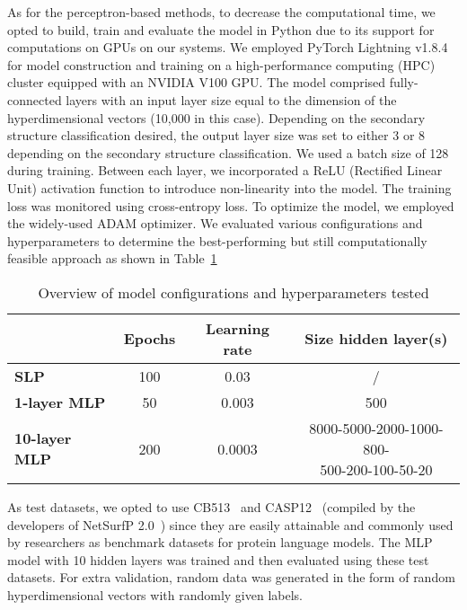 As for the perceptron-based methods, to decrease the computational time, we opted to build, train and evaluate the model in Python due to its support for computations on GPUs on our systems. We employed PyTorch Lightning v1.8.4 for model construction and training on a high-performance computing (HPC) cluster equipped with an NVIDIA V100 GPU. The model comprised fully-connected layers with an input layer size equal to the dimension of the hyperdimensional vectors (10,000 in this case). Depending on the secondary structure classification desired, the output layer size was set to either 3 or 8 depending on the secondary structure classification. We used a batch size of 128 during training. Between each layer, we incorporated a ReLU (Rectified Linear Unit) activation function to introduce non-linearity into the model. The training loss was monitored using cross-entropy loss. To optimize the model, we employed the widely-used ADAM optimizer. We evaluated various configurations and hyperparameters to determine the best-performing but still computationally feasible approach as shown in Table~\ref{tab:casp8}

\begin{table}[h]
    \caption{Overview of model configurations and hyperparameters tested}
    \label{tab:casp8}
    \centering
    \begin{tabular}{l|ccc}
        \toprule
         & Epochs & Learning rate & Size hidden layer(s)\\
        \midrule
        \textbf{SLP} & 100 & 0.03 & /\\
        \hline
        \textbf{1-layer MLP} & 50 & 0.003 & 500\\
        \hline
        \textbf{10-layer MLP} & 200 & 0.0003 & \makecell{8000-5000-2000-1000-800-\\500-200-100-50-20}\\
        \bottomrule
    \end{tabular}
  \end{table}

As test datasets, we opted to use CB513~\cite{cb513} and CASP12~\cite{casp12} (compiled by the developers of NetSurfP 2.0~\cite{netsurf}) since they are easily attainable and commonly used by researchers as benchmark datasets for protein language models. The MLP model with 10 hidden layers was trained and then evaluated using these test datasets. For extra validation, random data was generated in the form of random hyperdimensional vectors with randomly given labels.

